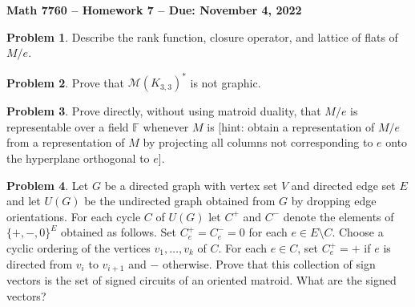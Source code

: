 \documentclass[letterpaper,11pt]{amsart}
\theoremstyle{plain}
\theoremstyle{definition}
\newtheorem{pr}{Problem}
\theoremstyle{remark}
\begin{document}
\Large

\begin{center}
{\bf Math 7760 -- Homework  7 --  Due:  November 4, 2022}
\end{center}

\normalsize


\bigskip


\bigskip

\begin{pr}
    Describe the rank function, closure operator, and lattice of flats of $M / e$.
\end{pr}

\bigskip

\bigskip

\begin{pr}
    Prove that $\mathcal{M}(K_{3,3})^*$ is not graphic.
\end{pr}

\begin{pr}
    Prove directly, without using matroid duality, that $M/e$ is representable over a field $\mathbb{F}$
    whenever $M$ is [hint: obtain a representation of $M/e$ from a representation of $M$ by projecting all columns not corresponding to $e$ onto the hyperplane orthogonal to $e$].
\end{pr}

\begin{pr}
    Let $G$ be a directed graph with vertex set $V$ and directed edge set $E$
    and let $U(G)$ be the undirected graph obtained from $G$ by dropping edge orientations.
    For each cycle $C$ of $U(G)$ let $C^+$ and $C^-$ denote the elements of $\{+,-,0\}^E$ obtained as follows.
    Set $C^+_e=C^-_e= 0$ for each $e \in E\setminus C$.
    Choose a cyclic ordering of the vertices $v_1,\dots,v_k$ of $C$.
    For each $e \in C$, set $C^+_e=+$ if $e$ is directed from $v_i$ to $v_{i+1}$ and $-$ otherwise.
    Prove that this collection of sign vectors is the set of signed circuits of an oriented matroid.
    What are the signed vectors?
\end{pr}
\end{document}
